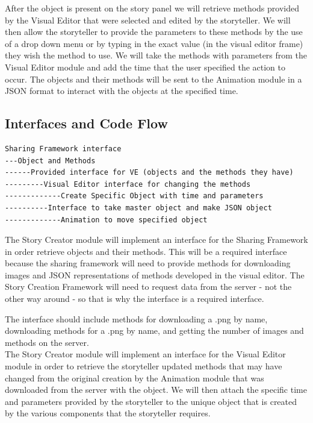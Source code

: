 \documentclass[12pt]{article}
\begin{document}
After the object is present on the story panel we will retrieve methods provided by the Visual Editor that were selected and edited by the storyteller.  We will then allow the storyteller to provide the parameters to these methods by the use of a drop down menu or by typing in the exact value (in the visual editor frame) they wish the method to use.  We will take the methods with parameters from the Visual Editor module and add the time that the user specified the action to occur.  The objects and their methods will be sent to the Animation module in a JSON format to interact with the objects at the specified time.  \\

\subsection{Interfaces and Code Flow}

\begin{verbatim}
Sharing Framework interface 
---Object and Methods 
------Provided interface for VE (objects and the methods they have)
---------Visual Editor interface for changing the methods 
-------------Create Specific Object with time and parameters 
----------Interface to take master object and make JSON object 
-------------Animation to move specified object 
\end{verbatim}


The Story Creator module will implement an interface for the Sharing Framework in order retrieve objects and their methods.  This will be a required interface because the sharing framework will need to provide methods for downloading images and JSON representations of methods developed in the visual editor. The Story Creation Framework will need to request data from the server - not the other way around - so that is why the interface is a required interface.

The interface should include methods for downloading a .png by name, downloading methods for a .png by name, and getting the number of images and methods on the server.  \\

The Story Creator module will implement an interface for the Visual Editor module in order to retrieve the storyteller updated methods that may have changed from the original creation by the Animation module that was downloaded from the server with the object.  We will then attach the specific time and parameters provided by the storyteller to the unique object that is created by   the various components that the storyteller requires. \\ 
\end{document}
